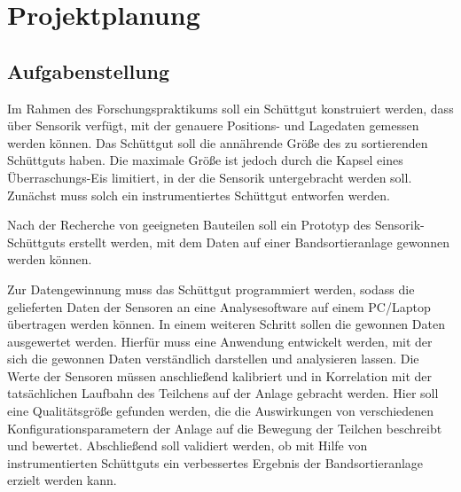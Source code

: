 \section{Projektplanung}

\subsection{Aufgabenstellung}

Im Rahmen des Forschungspraktikums soll ein Schüttgut konstruiert werden, dass über Sensorik verfügt, mit der genauere Positions- und Lagedaten gemessen werden können. Das Schüttgut soll die annährende Größe des zu sortierenden Schüttguts haben. Die maximale Größe ist jedoch durch die Kapsel eines Überraschungs-Eis limitiert, in der die Sensorik untergebracht werden soll. Zunächst muss solch ein instrumentiertes Schüttgut entworfen werden.
 
Nach der Recherche von geeigneten Bauteilen soll ein Prototyp des Sensorik-Schüttguts erstellt werden, mit dem Daten auf einer Bandsortieranlage gewonnen werden können.

Zur Datengewinnung muss das Schüttgut programmiert werden, sodass die gelieferten Daten der Sensoren an eine Analysesoftware auf einem  PC/Laptop übertragen werden können. In einem weiteren Schritt sollen die gewonnen Daten ausgewertet werden. Hierfür muss eine Anwendung entwickelt werden, mit der sich die gewonnen Daten verständlich darstellen und analysieren lassen.
Die Werte der Sensoren müssen anschließend kalibriert und in Korrelation mit der tatsächlichen Laufbahn des Teilchens auf der Anlage gebracht werden. Hier soll eine Qualitätsgröße gefunden werden, die die Auswirkungen von verschiedenen Konfigurationsparametern der Anlage auf die Bewegung der Teilchen beschreibt und bewertet. 
Abschließend soll validiert werden, ob mit Hilfe von instrumentierten Schüttguts ein verbessertes Ergebnis der Bandsortieranlage erzielt werden kann.

